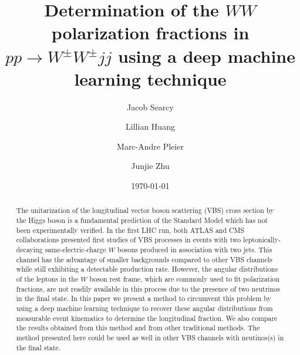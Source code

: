 \documentclass[aps,prd,twocolumn,showpacs,superscriptaddress]{revtex4}  %
\begin{document}
\title{Determination of the $WW$ polarization fractions in $pp \rightarrow W^\pm W^\pm jj$ using a deep machine learning technique}
\author{Jacob Searcy}
\author{Lillian Huang}
\author{Marc-Andre Pleier}
\author{Junjie Zhu}

\date{\today}

\begin{abstract}
The unitarization of the longitudinal vector boson scattering (VBS) cross section by the Higgs boson is 
a fundamental prediction of the Standard Model which has not been experimentally verified. In the first LHC run, 
both ATLAS and CMS collaborations presented first studies of VBS processes in events with two leptonically-decaying same-electric-charge 
$W$ bosons produced in association with two jets. This channel has the advantage of smaller backgrounds 
compared to other VBS channels while still exhibiting a detectable production rate. 
However, the angular distributions of the leptons in the $W$ boson rest frame, which are commonly used to 
fit polarization fractions, are not readily available in this process due to the presence of two neutrinos in the final state. 
In this paper we present a method to circumvent this problem by using a deep machine learning technique to 
recover these angular distributions from measurable event kinematics to determine the longitudinal fraction. 
We also compare the results obtained from this method and from other traditional methods. The method presented here could be 
used as well in other VBS channels with neutinos(s) in the final state. 
\end{abstract}

\maketitle


\end{document}
